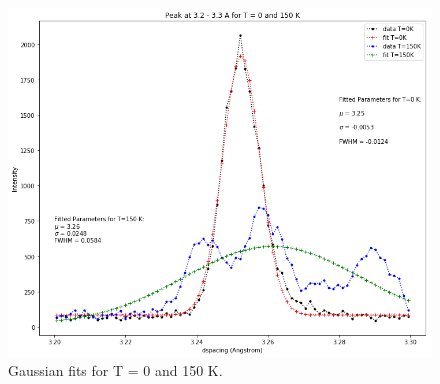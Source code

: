 	\begin{figure}[h]
	\centering
	\includegraphics[scale=0.35]{../figs/fits.png}
	\caption{Gaussian fits for T = 0 and 150 K.}
	\label{fig:fits}
	\end{figure}
	
